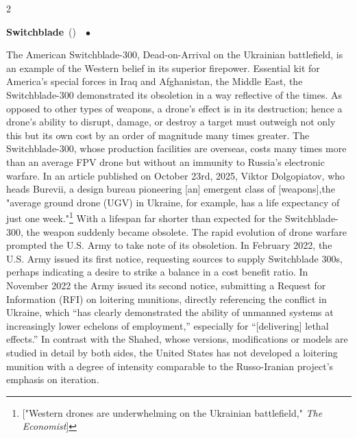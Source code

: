\documentclass[10pt,a4paper,twoside]{article} %
\newcommand{\entry}[4]{\markboth{#1}{#1}\textbf{#1}\ {(#2)}\ \textit{#3}\ $\bullet$\ {#4}}  %
\begin{document}
\begin{multicols}{2}
{\entry{Switchblade} {} {} {The American Switchblade-300, Dead-on-Arrival on the Ukrainian battlefield, is an example of the Western belief in its superior firepower. Essential kit for America's special forces in Iraq and Afghanistan, the Middle East, the Switchblade-300 demonstrated its obsoletion in a way reflective of the times. As opposed to other types of weapons, a drone's effect is in its destruction; hence a drone's ability to disrupt, damage, or destroy a target must outweigh not only this but its own cost by an order of magnitude many times greater. The Switchblade-300, whose production facilities are overseas, costs many times more than an average FPV drone but without an immunity to Russia's electronic warfare. In an article published on October 23rd, 2025, Viktor Dolgopiatov, who heads Burevii, a design bureau pioneering [an] emergent class of [weapons],the "average ground drone (UGV) in Ukraine, for example, has a life expectancy of just one week."\footnote{["Western drones are underwhelming on the Ukrainian battlefield," \emph{The Economist}]} With a lifespan far shorter than expected for the Switchblade-300, the weapon suddenly became obsolete. \newline \indent The rapid evolution of drone warfare prompted the U.S. Army to take note of its obsoletion. In February 2022, the U.S. Army issued its first notice, requesting sources to supply Switchblade 300s, perhaps indicating a desire to strike a balance in a cost benefit ratio. In November 2022 the Army issued its second notice, submitting a Request for Information (RFI) on loitering munitions, directly referencing the conflict in Ukraine, which “has clearly demonstrated the ability of unmanned systems at increasingly lower echelons of employment,” especially for “[delivering] lethal effects.” \newline \indent In contrast with the Shahed, whose versions, modifications or models are studied in detail by both sides, the United States has not developed a loitering munition with a degree of intensity comparable to the Russo-Iranian project's emphasis on iteration. 

}

}
\end{multicols}
\end{document}

